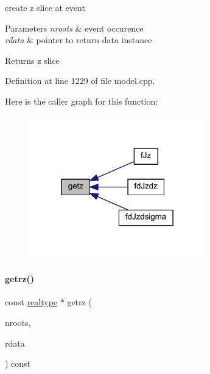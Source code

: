 create z slice at event 
\begin{DoxyParams}{Parameters}
{\em nroots} & event occurence \\
\hline
{\em rdata} & pointer to return data instance \\
\hline
\end{DoxyParams}
\begin{DoxyReturn}{Returns}
z slice 
\end{DoxyReturn}


Definition at line 1229 of file model.\+cpp.

Here is the caller graph for this function\+:
\nopagebreak
\begin{figure}[H]
\begin{center}
\leavevmode
\includegraphics[width=217pt]{classamici_1_1_model_a30571e418f94ca61b8df2b355e46ee1a_icgraph}
\end{center}
\end{figure}
\mbox{\label{classamici_1_1_model_ab2a9be3bb641741a52ddc48fcd9aa143}} 
\paragraph{\texorpdfstring{getrz()}{getrz()}}
{\footnotesize\ttfamily const \mbox{\hyperlink{namespaceamici_a1bdce28051d6a53868f7ccbf5f2c14a3}{realtype}} $\ast$ getrz (\begin{DoxyParamCaption}\item[{const int}]{nroots,  }\item[{const \mbox{\hyperlink{classamici_1_1_return_data}{Return\+Data}} $\ast$}]{rdata }\end{DoxyParamCaption}) const\hspace{0.3cm}{\ttfamily [protected]}}

